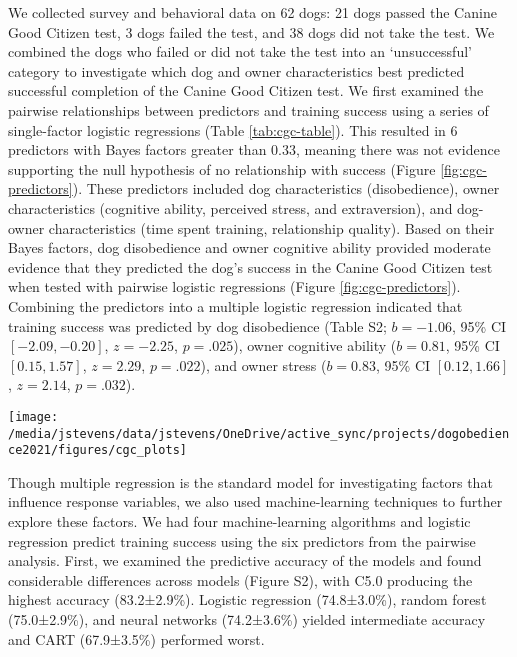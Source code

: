 \documentclass[
  english,
  ,pub,floatsintext]{apa6}
\begin{document}
We collected survey and behavioral data on 62 dogs: 21 dogs passed the Canine Good Citizen test, 3 dogs failed the test, and 38 dogs did not take the test. We combined the dogs who failed or did not take the test into an `unsuccessful' category to investigate which dog and owner characteristics best predicted successful completion of the Canine Good Citizen test. We first examined the pairwise relationships between predictors and training success using a series of single-factor logistic regressions (Table \ref{tab:cgc-table}). This resulted in 6 predictors with Bayes factors greater than 0.33, meaning there was not evidence supporting the null hypothesis of no relationship with success (Figure \ref{fig:cgc-predictors}). These predictors included dog characteristics (disobedience), owner characteristics (cognitive ability, perceived stress, and extraversion), and dog-owner characteristics (time spent training, relationship quality). Based on their Bayes factors, dog disobedience and owner cognitive ability provided moderate evidence that they predicted the dog's success in the Canine Good Citizen test when tested with pairwise logistic regressions (Figure \ref{fig:cgc-predictors}). Combining the predictors into a multiple logistic regression indicated that training success was predicted by dog disobedience (Table S2; \(b = -1.06\), 95\% CI \([-2.09, -0.20]\), \(z = -2.25\), \(p = .025\)), owner cognitive ability (\(b = 0.81\), 95\% CI \([0.15, 1.57]\), \(z = 2.29\), \(p = .022\)), and owner stress (\(b = 0.83\), 95\% CI \([0.12, 1.66]\), \(z = 2.14\), \(p = .032\)).



\begin{figure*}
\texttt{[image: /media/jstevens/data/jstevens/OneDrive/active\_sync/projects/dogobedience2021/figures/cgc\_plots]} \caption{Effects of predictors on Canine Good Citizen training success. We conducted logistic regression analyses for each predictor. Open circles represent individual data points, curves represented fitted logistic regression lines, and the bands represent 95\% confidence intervals for regression curves.}\label{fig:cgc-predictors}
\end{figure*}

Though multiple regression is the standard model for investigating factors that influence response variables, we also used machine-learning techniques to further explore these factors. We had four machine-learning algorithms and logistic regression predict training success using the six predictors from the pairwise analysis. First, we examined the predictive accuracy of the models and found considerable differences across models (Figure S2), with C5.0 producing the highest accuracy (83.2±2.9\%). Logistic regression (74.8±3.0\%), random forest (75.0±2.9\%), and neural networks (74.2±3.6\%) yielded intermediate accuracy and CART (67.9±3.5\%) performed worst.
\end{document}
